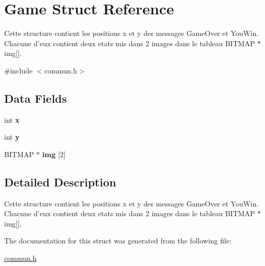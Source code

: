 \hypertarget{struct_game}{\section{Game Struct Reference}
\label{struct_game}
}


Cette structure contient les positions x et y des messages Game\-Over et You\-Win. Chacune d'eux contient deux etats mis dans 2 images dans le tableau B\-I\-T\-M\-A\-P $\ast$img\mbox{[}\mbox{]}.  




{\ttfamily \#include $<$commun.\-h$>$}

\subsection*{Data Fields}
\begin{DoxyCompactItemize}
\item 
\hypertarget{struct_game_a6150e0515f7202e2fb518f7206ed97dc}{int {\bfseries x}}\label{struct_game_a6150e0515f7202e2fb518f7206ed97dc}

\item 
\hypertarget{struct_game_a0a2f84ed7838f07779ae24c5a9086d33}{int {\bfseries y}}\label{struct_game_a0a2f84ed7838f07779ae24c5a9086d33}

\item 
\hypertarget{struct_game_ab1bd34bcded6c8709b926189b4f50c2c}{B\-I\-T\-M\-A\-P $\ast$ {\bfseries img} \mbox{[}2\mbox{]}}\label{struct_game_ab1bd34bcded6c8709b926189b4f50c2c}

\end{DoxyCompactItemize}


\subsection{Detailed Description}
Cette structure contient les positions x et y des messages Game\-Over et You\-Win. Chacune d'eux contient deux etats mis dans 2 images dans le tableau B\-I\-T\-M\-A\-P $\ast$img\mbox{[}\mbox{]}. 


\begin{DoxyItemize}
\item 
\end{DoxyItemize}

The documentation for this struct was generated from the following file\-:\begin{DoxyCompactItemize}
\item 
\hyperlink{commun_8h}{commun.\-h}\end{DoxyCompactItemize}
